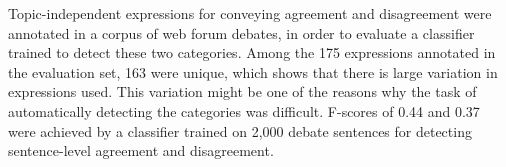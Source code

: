 Topic-independent expressions for conveying agreement and disagreement were annotated in a corpus of web forum debates, in order to evaluate a classifier trained to detect these two categories.  Among the 175              expressions annotated in the evaluation set, 163 were unique, which shows that there is large variation in expressions used. This variation might be one of the reasons why the task of automatically detecting the categories was difficult. F-scores of 0.44 and 0.37 were achieved by a classifier trained on 2,000 debate sentences for detecting sentence-level agreement and disagreement.
